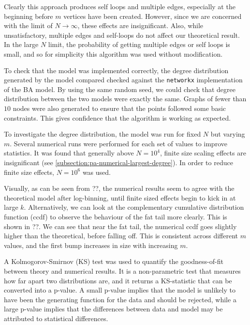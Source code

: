 Clearly this approach produces self loops and multiple edges, especially at the beginning before $m$ vertices have been created. However, since we are concerned with the limit of $N \rightarrow \infty$, these effects are insignificant. Also, while unsatisfactory, multiple edges and self-loops do not affect our theoretical result. In the large $N$ limit, the probability of getting multiple edges or self loops is small, and so for simplicity this algorithm was used without modification. 

To check that the model was implemented correctly, the degree distribution generated by the model compared checked against the \texttt{networkx} implementation of the BA model. By using the same random seed, we could check that degree distribution between the two models were exactly the same. Graphs of fewer than $10$ nodes were also generated to ensure that the points followed some basic constraints. This gives confidence that the algorithm is working as expected. 

To investigate the degree distribution, the model was run for fixed $N$ but varying $m$. Several numerical runs were performed for each set of values to improve statistics. It was found that generally above $N=10^4$, finite size scaling effects are insignificant (see \autoref{subsection:pa-numerical-largest-degree}). In order to reduce finite size effects, $N=10^6$ was used. 

Visually, as can be seen from ??, the numerical results seem to agree with the theoretical model after log-binning, until finite sized effects begin to kick in at large $k$. Alternatively, we can look at the complementary cumulative distribution function (ccdf) to observe the behaviour of the fat tail more clearly. This is shown in ??. We can see that near the fat tail, the numerical ccdf goes slightly higher than the theoretical, before falling off. This is consistent across different $m$ values, and the first bump increases in size with increasing $m$. 

A Kolmogorov-Smirnov (KS) test was used to quantify the goodness-of-fit between theory and numerical results. It is a non-parametric test that measures how far apart two distributions are, and it returns a KS-statistic that can be converted into a p-value. A small p-value implies that the model is unlikely to have been the generating function for the data and should be rejected, while a large p-value implies that the differences between data and model may be attributed to statistical differences. 

